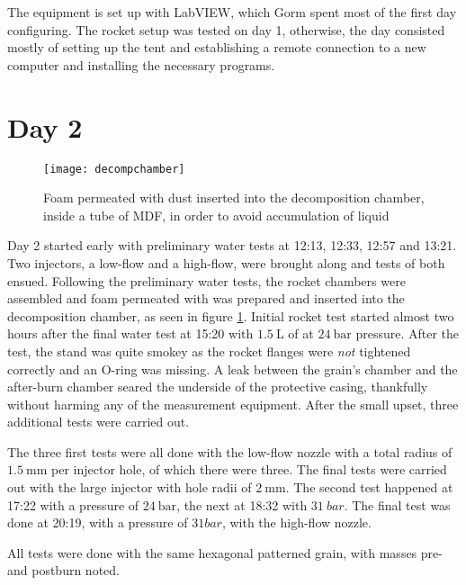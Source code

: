 		The equipment is set up with LabVIEW, which Gorm spent most of the first day configuring. The rocket setup was tested on day 1, otherwise, the day consisted mostly of setting up the tent and establishing a remote connection to a new computer and installing the necessary programs.

	\section{Day 2}

		\begin{figure}
			\centering
			\texttt{[image: decompchamber]}
			\caption{Foam permeated with  dust inserted into the decomposition chamber, inside a tube of MDF, in order to avoid accumulation of liquid }
			\label{fig:kmno4foam}
		\end{figure}

		Day 2 started early with preliminary water tests at 12:13, 12:33, 12:57 and 13:21. Two injectors, a low-flow and a high-flow, were brought along and tests of both ensued. Following the preliminary water tests, the rocket chambers were assembled and foam permeated with  was prepared and inserted into the decomposition chamber, as seen in figure \ref{fig:kmno4foam}. Initial rocket test started almost two hours after the final water test at 15:20 with $\SI{1.5}{\liter}$ of  at $\SI{24}{\bar}$ pressure. After the test, the stand was quite smokey as the rocket flanges were \emph{not} tightened correctly and an O-ring was missing. A leak between the grain's chamber and the after-burn chamber seared the underside of the protective casing, thankfully without harming any of the measurement equipment. After the small upset, three additional tests were carried out. 

		The three first tests were all done with the low-flow nozzle with a total radius of $\SI{1.5}{\milli \metre}$ per injector hole, of which there were three. The final tests were carried out with the large injector with hole radii of $\SI{2}{\milli \metre}$. The second test happened at 17:22 with a  pressure of $\SI{24}{\bar}$, the next at 18:32 with $\SI{31}{bar}$. The final test was done at 20:19, with a  pressure of $\si{31}{bar}$, with the high-flow nozzle.

		All tests were done with the same hexagonal patterned grain, with masses pre- and postburn noted.

